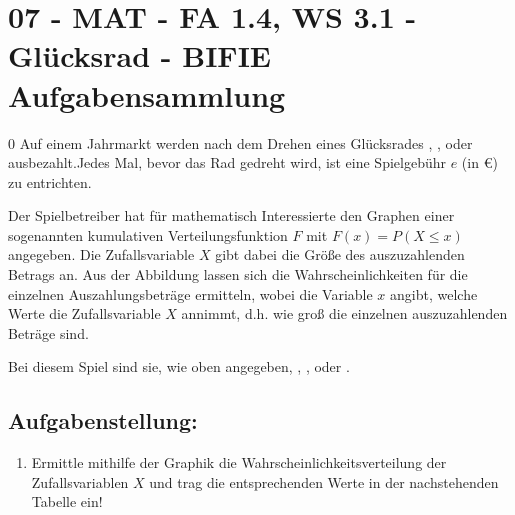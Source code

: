 \section{07 - MAT - FA 1.4, WS 3.1 - Glücksrad - BIFIE Aufgabensammlung}

\begin{langesbeispiel} \item[0] %
				Auf einem Jahrmarkt werden nach dem Drehen eines Glücksrades , ,  oder  ausbezahlt.Jedes Mal, bevor das Rad gedreht wird, ist eine Spielgebühr $e$ (in \euro) zu entrichten.
				
Der Spielbetreiber hat für mathematisch Interessierte den Graphen einer sogenannten kumulativen Verteilungsfunktion $F$ mit $F(x)=P(X \leq x)$ angegeben. Die Zufallsvariable $X$ gibt dabei die Größe des auszuzahlenden Betrags an. Aus der Abbildung lassen sich die Wahrscheinlichkeiten für die einzelnen Auszahlungsbeträge ermitteln, wobei die Variable $x$ angibt, welche Werte die Zufallsvariable $X$ annimmt, d.h. wie groß die einzelnen auszuzahlenden Beträge sind.

Bei diesem Spiel sind sie, wie oben angegeben, , ,  oder . 
				\leer
				\begin{center}
				\end{center}
				
\subsection{Aufgabenstellung:}
\begin{enumerate}
	\item Ermittle mithilfe der Graphik die Wahrscheinlichkeitsverteilung der Zufallsvariablen $X$ und trag die entsprechenden Werte in der nachstehenden Tabelle ein!
	\leer
	

\end{enumerate}
\end{langesbeispiel}
